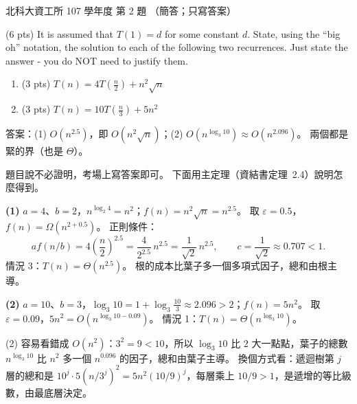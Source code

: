 \begin{pastexam}[label={px:ntut-107-ci-02}]{北科大資工所 107 學年度 第 2 題}
（簡答；只寫答案）

(6 pts) It is assumed that $T(1)=d$ for some constant $d$. State, using the ``big oh'' notation,
the solution to each of the following two recurrences. Just state the answer - you do NOT need
to justify them.
\begin{enumerate}[label=(\arabic*)]
\item (3 pts) $T(n)=4T(\frac{n}{2})+n^2\sqrt{n}$
\item (3 pts) $T(n)=10T(\frac{n}{3})+5n^2$
\end{enumerate}
\end{pastexam}

\begin{pastsoln}
答案：(1) $O(n^{2.5})$，即 $O(n^2\sqrt{n})$；(2) $O(n^{\log_3 10}) \approx O(n^{2.096})$。 兩個都是
緊的界（也是 $\Theta$）。

題目說不必證明，考場上寫答案即可。 下面用主定理（資結書定理~2.4）說明怎麼得到。

\textbf{(1)} $a = 4$、$b = 2$，$n^{\log_2 4} = n^2$；$f(n) = n^2\sqrt{n} = n^{2.5}$。 取 $\varepsilon = 0.5$，
$f(n) = \Omega(n^{2 + 0.5})$。 正則條件：
\[
a f(n/b) = 4 \left(\frac n2\right)^{2.5} = \frac{4}{2^{2.5}}\, n^{2.5} = \frac{1}{\sqrt2}\, n^{2.5},
\qquad c = \frac{1}{\sqrt2} \approx 0.707 < 1 .
\]
情況 3：$T(n) = \Theta(n^{2.5})$。 根的成本比葉子多一個多項式因子，總和由根主導。

\textbf{(2)} $a = 10$、$b = 3$，$\log_3 10 = 1 + \log_3 \frac{10}{3} \approx 2.096 > 2$；$f(n) = 5n^2$。 取
$\varepsilon = 0.09$，$5n^2 = O(n^{\log_3 10 - 0.09})$。 情況 1：$T(n) = \Theta(n^{\log_3 10})$。

(2) 容易看錯成 $O(n^2)$：$3^2 = 9 < 10$，所以 $\log_3 10$ 比 $2$ 大一點點，葉子的總數 $n^{\log_3 10}$
比 $n^2$ 多一個 $n^{0.096}$ 的因子，總和由葉子主導。 換個方式看：遞迴樹第 $j$ 層的總和是
$10^j \cdot 5(n/3^j)^2 = 5n^2 (10/9)^j$，每層乘上 $10/9 > 1$，是遞增的等比級數，由最底層決定。
\end{pastsoln}

